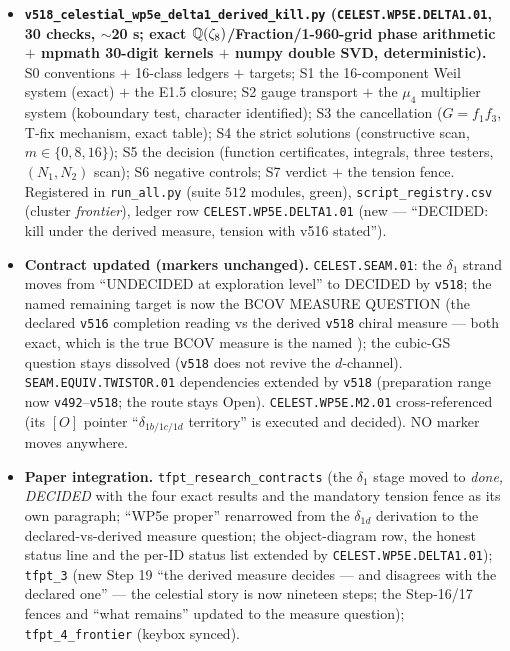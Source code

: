 \begin{itemize}[leftmargin=1.5em]
\item \textbf{\texttt{v518\_celestial\_wp5e\_delta1\_derived\_kill.py} (\texttt{CELEST.WP5E.DELTA1.01},
30 checks, $\sim$20 s; exact $\mathbb{Q}(\zeta_8)$/Fraction/1-960-grid phase arithmetic $+$ mpmath
30-digit kernels $+$ numpy double SVD, deterministic).} S0 conventions $+$ 16-class ledgers $+$
targets; S1 the 16-component Weil system (exact) $+$ the E1.5 closure; S2 gauge transport $+$
the $\mu_4$ multiplier system (koboundary test, character identified); S3 the cancellation
($G=f_1f_3$, T-fix mechanism, exact table); S4 the strict solutions (constructive scan,
$m\in\{0,8,16\}$); S5 the decision (function certificates, integrals, three testers, $(N_1,N_2)$
scan); S6 negative controls; S7 verdict $+$ the tension fence. Registered in
\texttt{run\_all.py} (suite $512$ modules, green), \texttt{script\_registry.csv} (cluster
\emph{frontier}), ledger row \texttt{CELEST.WP5E.DELTA1.01} (new --- ``DECIDED: kill under the
derived measure, tension with v516 stated'').
\item \textbf{Contract updated (markers unchanged).} \texttt{CELEST.SEAM.01}: the $\delta_1$
strand moves from ``UNDECIDED at exploration level'' to DECIDED by \texttt{v518}; the named
remaining target is now the BCOV MEASURE QUESTION (the declared \texttt{v516} completion
reading vs the derived \texttt{v518} chiral measure --- both exact, which is the true BCOV
measure is the named \mO); the cubic-GS question stays dissolved (\texttt{v518} does not revive
the $d$-channel). \texttt{SEAM.EQUIV.TWISTOR.01} dependencies extended by \texttt{v518}
(preparation range now \texttt{v492}--\texttt{v518}; the route stays Open).
\texttt{CELEST.WP5E.M2.01} cross-referenced (its $[O]$ pointer ``$\delta_{1b/1c/1d}$
territory'' is executed and decided). NO marker moves anywhere.
\item \textbf{Paper integration.} \texttt{tfpt\_research\_contracts} (the $\delta_1$ stage moved
to \emph{done, DECIDED} with the four exact results and the mandatory tension fence as its own
paragraph; ``WP5e proper'' renarrowed from the $\delta_{1d}$ derivation to the
declared-vs-derived measure question; the object-diagram row, the honest status line and the
per-ID status list extended by \texttt{CELEST.WP5E.DELTA1.01}); \texttt{tfpt\_3} (new Step 19
``the derived measure decides --- and disagrees with the declared one'' --- the celestial story
is now nineteen steps; the Step-16/17 fences and ``what remains'' updated to the measure
question); \texttt{tfpt\_4\_frontier} (keybox synced).

\end{itemize}
